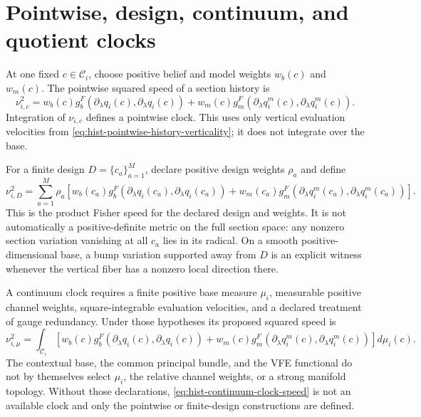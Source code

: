 \section{Pointwise, design, continuum, and quotient clocks}
\label{sec:hist-clock-tiers}

At one fixed $c\in\mathcal C_i$, choose positive belief and model weights
$w_b(c)$ and $w_m(c)$.  The pointwise squared speed of a section history is
\begin{equation}
\nu_{i,c}^2
=w_b(c)g_b^F(\partial_\lambda q_i(c),\partial_\lambda q_i(c))
+w_m(c)g_m^F(\partial_\lambda q_i^m(c),\partial_\lambda q_i^m(c)).
\label{eq:hist-pointwise-clock-speed}
\end{equation}
Integration of $\nu_{i,c}$ defines a pointwise clock.  This uses only
vertical evaluation velocities from
\eqref{eq:hist-pointwise-history-verticality}; it does not integrate over
the base.  

For a finite design $D=\{c_a\}_{a=1}^M$, declare positive design weights
$\rho_a$ and define
\begin{equation}
\nu_{i,D}^2
=\sum_{a=1}^M\rho_a\left[
w_b(c_a)g_b^F(\partial_\lambda q_i(c_a),\partial_\lambda q_i(c_a))
+w_m(c_a)g_m^F(\partial_\lambda q_i^m(c_a),\partial_\lambda q_i^m(c_a))
\right].
\label{eq:hist-finite-design-clock-speed}
\end{equation}
This is the product Fisher speed for the declared design and weights.
It is not automatically a positive-definite metric on the full section
space: any nonzero section variation vanishing at all $c_a$ lies in its
radical.  On a smooth positive-dimensional base, a bump variation supported
away from $D$ is an explicit witness whenever the vertical fiber has a
nonzero local direction there.  

A continuum clock requires a finite positive base measure $\mu_i$, measurable
positive channel weights, square-integrable evaluation velocities, and a
declared treatment of gauge redundancy.  Under those hypotheses its proposed
squared speed is
\begin{equation}
\nu_{i,\mu}^2
=\int_{\mathcal C_i}\left[
w_b(c)g_b^F(\partial_\lambda q_i(c),\partial_\lambda q_i(c))
+w_m(c)g_m^F(\partial_\lambda q_i^m(c),\partial_\lambda q_i^m(c))
\right]d\mu_i(c).
\label{eq:hist-continuum-clock-speed}
\end{equation}
The contextual base, the common principal bundle, and the VFE functional do
not by themselves select $\mu_i$, the relative channel weights, or a strong
manifold topology.  Without those declarations,
\eqref{eq:hist-continuum-clock-speed} is not an available clock and only the
pointwise or finite-design constructions are defined.  

